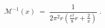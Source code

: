 \begin{equation}\label{mapp}
{\mathcal M}^{-1}(x) \;=\; \frac{1}{2 \pi^2 r ( \frac{e^2}{8} r +
    \frac{2}{\pi} ) }\;.
\end{equation}

